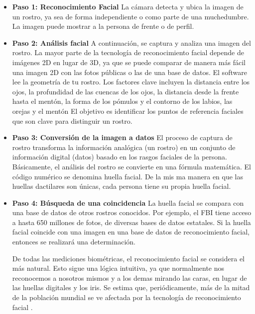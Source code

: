 \begin{itemize}
  \item \textbf{Paso 1: Reconocimiento Facial} 
La cámara detecta y ubica la imagen de un rostro, ya sea de forma independiente o como parte de una muchedumbre. La imagen puede mostrar a la
persona de frente o de perfil.
  \item \textbf{Paso 2: Análisis facial}
A continuación, se captura y analiza una imagen del rostro. La mayor parte
de la tecnología de reconocimiento facial depende de imágenes 2D en lugar de
3D, ya que se puede comparar de manera más fácil una imagen 2D con las
fotos públicas o las de una base de datos. El software lee la geometría de tu
rostro. Los factores clave incluyen la distancia entre los ojos, la profundidad de
las cuencas de los ojos, la distancia desde la frente hasta el mentón, la forma
de los pómulos y el contorno de los labios, las orejas y el mentón El objetivo
es identificar los puntos de referencia faciales que son clave para distinguir un
rostro.
  \item \textbf{Paso 3: Conversión de la imagen a datos}
El proceso de captura de rostro transforma la información analógica (un
rostro) en un conjunto de información digital (datos) basado en los rasgos faciales de la persona. Básicamente, el análisis del rostro se convierte en una
fórmula matemática. El código numérico se denomina huella facial. De la mis
ma manera en que las huellas dactilares son únicas, cada persona tiene su
propia huella facial.
  \item \textbf{Paso 4: Búsqueda de una coincidencia}
La huella facial se compara con una base de datos de otros rostros conocidos. Por ejemplo, el FBI tiene acceso a hasta 650 millones de fotos, de diversas
bases de datos estatales. Si la huella facial coincide con una imagen en una base
de datos de reconocimiento facial, entonces se realizará una determinación.

De todas las mediciones biométricas, el reconocimiento facial se considera
el más natural. Esto sigue una lógica intuitiva, ya que normalmente nos reconocemos a nosotros mismos y a los demas mirando las caras, en lugar de
las huellas digitales y los iris. Se estima que, periódicamente, más de la mitad
de la población mundial se ve afectada por la tecnología de reconocimiento
facial \cite{reconocimientoKaspersky,azureFaceRecognition}.
\end{itemize}


